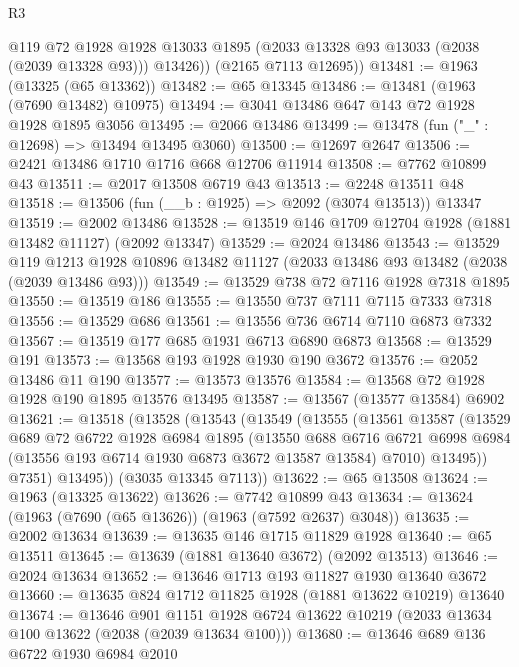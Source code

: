 \begin{lexlean}{R3}
\begin{coremodule}
          @119
          @72
          @1928
          @1928
          @13033
          @1895
          (@2033 @13328 @93 @13033 (@2038 (@2039 @13328 @93)))
          @13426))
      (@2165 @7113 @12695))
@13481 := @1963 (@13325 (@65 @13362))
@13482 := @65 @13345
@13486 := @13481 (@1963 (@7690 @13482) @10975)
@13494 := @3041 @13486 @647 @143 @72 @1928 @1928 @1895 @3056
@13495 := @2066 @13486
@13499 := @13478 (fun ("_" : @12698) => @13494 @13495 @3060)
@13500 := @12697 @2647
@13506 := @2421 @13486 @1710 @1716 @668 @12706 @11914
@13508 := @7762 @10899 @43
@13511 := @2017 @13508 @6719 @43
@13513 := @2248 @13511 @48
@13518 := @13506 (fun (__b : @1925) => @2092 (@3074 @13513)) @13347
@13519 := @2002 @13486
@13528 := @13519 @146 @1709 @12704 @1928 (@1881 @13482 @11127) (@2092 @13347)
@13529 := @2024 @13486
@13543 := @13529
    @119
    @1213
    @1928
    @10896
    @13482
    @11127
    (@2033 @13486 @93 @13482 (@2038 (@2039 @13486 @93)))
@13549 := @13529 @738 @72 @7116 @1928 @7318 @1895
@13550 := @13519 @186
@13555 := @13550 @737 @7111 @7115 @7333 @7318
@13556 := @13529 @686
@13561 := @13556 @736 @6714 @7110 @6873 @7332
@13567 := @13519 @177 @685 @1931 @6713 @6890 @6873
@13568 := @13529 @191
@13573 := @13568 @193 @1928 @1930 @190 @3672
@13576 := @2052 @13486 @11 @190
@13577 := @13573 @13576
@13584 := @13568 @72 @1928 @1928 @190 @1895 @13576 @13495
@13587 := @13567 (@13577 @13584) @6902
@13621 := @13518
    (@13528
      (@13543
        (@13549
          (@13555
            (@13561
              @13587
              (@13529
                @689
                @72
                @6722
                @1928
                @6984
                @1895
                (@13550
                  @688
                  @6716
                  @6721
                  @6998
                  @6984
                  (@13556 @193 @6714 @1930 @6873 @3672 @13587 @13584)
                  @7010)
                @13495))
            @7351)
          @13495))
      (@3035 @13345 @7113))
@13622 := @65 @13508
@13624 := @1963 (@13325 @13622)
@13626 := @7742 @10899 @43
@13634 := @13624 (@1963 (@7690 (@65 @13626)) (@1963 (@7592 @2637) @3048))
@13635 := @2002 @13634
@13639 := @13635 @146 @1715 @11829 @1928
@13640 := @65 @13511
@13645 := @13639 (@1881 @13640 @3672) (@2092 @13513)
@13646 := @2024 @13634
@13652 := @13646 @1713 @193 @11827 @1930 @13640 @3672
@13660 := @13635 @824 @1712 @11825 @1928 (@1881 @13622 @10219) @13640
@13674 := @13646
    @901
    @1151
    @1928
    @6724
    @13622
    @10219
    (@2033 @13634 @100 @13622 (@2038 (@2039 @13634 @100)))
@13680 := @13646 @689 @136 @6722 @1930 @6984 @2010

\end{coremodule}
\end{lexlean}
